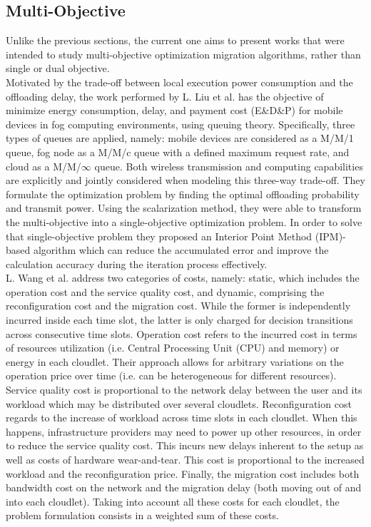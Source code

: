 \subsection{Multi-Objective}\label{sec:multi}
Unlike the previous sections, the current one aims to present works that were intended to study multi-objective optimization migration algorithms, rather than single or dual objective.\\
\noindent\tab Motivated by the trade-off between local execution power consumption and the offloading delay, the work performed by L. Liu et al. \cite{liu2018multiobjective} has the objective of minimize energy consumption, delay, and payment cost (E\&D\&P) for mobile devices in fog computing environments, using queuing theory. Specifically, three types of queues are applied, namely: mobile devices are considered as a M/M/1 queue, fog node as a M/M/c queue with a defined maximum request rate, and cloud as a M/M/$\infty$ queue. Both wireless transmission and computing capabilities are explicitly and jointly considered when modeling this three-way trade-off. They formulate the optimization problem by finding the optimal offloading probability and transmit power. Using the scalarization method, they were able to transform the multi-objective into a single-objective optimization problem. In order to solve that single-objective problem they proposed an Interior Point Method (IPM)-based algorithm which can reduce the accumulated error and improve the calculation accuracy during the iteration process effectively.\\
\noindent\tab L. Wang \cite{wang2018moera} et al. address two categories of costs, namely: static, which includes the operation cost and the service quality cost, and dynamic, comprising the reconfiguration cost and the migration cost. While the former is independently incurred inside each time slot, the latter is only charged for decision transitions across consecutive time slots. Operation cost refers to the incurred cost in terms of resources utilization (i.e. Central Processing Unit (CPU) and memory) or energy in each cloudlet. Their approach allows for arbitrary variations on the operation price over time (i.e. can be heterogeneous for different resources). Service quality cost is proportional to the network delay between the user and its workload which may be distributed over several cloudlets. Reconfiguration cost regards to the increase of workload across time slots in each cloudlet. When this happens, infrastructure providers may need to power up other resources, in order to reduce the service quality cost. This incurs new delays inherent to the setup as well as costs of hardware wear-and-tear. This cost is proportional to the increased workload and the reconfiguration price. Finally, the migration cost includes both bandwidth cost on the network and the migration delay (both moving out of and into each cloudlet). Taking into account all these costs for each cloudlet, the problem formulation consists in a weighted sum of these costs. 
